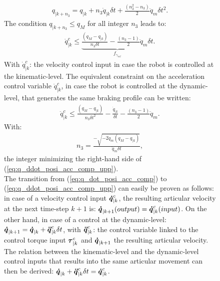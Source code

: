 \begin{figure}[!htbp]
\begin{equation}
\begin{split}
q_{|k+n_3} = q_{|k} + n_3 \dot{q}_{|k} \delta t + \frac{(n_3^2-n_3)}{2} \ddot{q}_{m} \delta t^2.
\label{eq:q_evolution_with_const_qddot_m}
\end{split}
\end{equation}
The condition $q_{|k+n_3} \leq q_{M}$ for all integer $n_3$ leads to:
\begin{equation}
\begin{split}
\dot{q}_{|k}^{c} \leq \underbrace{\frac{(q_M-q_{|k})}{n_3 \delta t} - \frac{(n_3-1)}{2} \ddot{q}_m \delta t}_{f_{{\gamma}_{vel}}}. 
\label{eq:q_dot_posi_acc_comp}
\end{split}
\end{equation}
With $\dot{q}_{|k}^{c}$: the velocity control input in case the robot is controlled at the kinematic-level. The equivalent constraint on the acceleration control variable $\ddot{q}_{|k}^{c}$, in case the robot is controlled at the dynamic-level, that generates the same braking profile can be written:
\begin{equation}
\begin{split}
\ddot{q}_{|k}^{c} \leq \frac{(q_M-q_{|k})}{n_3 \delta t^2} - \frac{\dot{q}_{|k}}{\delta t} - \frac{(n_3-1)}{2} \ddot{q}_m.
\label{eq:q_ddot_posi_acc_comp_upp}
\end{split}
\end{equation}
With: 
\begin{equation}
\begin{split}
n_3 = \frac{-\sqrt{-2 \ddot{q}_m (q_M - q_{|k})}}{\ddot{q}_m \delta t},
\label{eq:n_3_Acc_posi_comp}
\end{split}
\end{equation}
the integer minimizing the right-hand side of (\ref{eq:q_ddot_posi_acc_comp_upp}). \\
The transition from (\ref{eq:q_dot_posi_acc_comp}) to (\ref{eq:q_ddot_posi_acc_comp_upp}) can easily be proven as follows: in case of a velocity control input $\mbox{\boldmath${\dot{q}}$}_{|k}^{c}$, the resulting articular velocity at the next time-step $k+1$ is: $\mbox{\boldmath${\dot{q}}$}_{|k+1} (output)= \mbox{\boldmath${\dot{q}}$}_{|k}^{c} (input)$. On the other hand, in case of a control at the dynamic-level: $\mbox{\boldmath${\dot{q}}$}_{|k+1} = \mbox{\boldmath${\dot{q}}$}_{|k}+\mbox{\boldmath${\ddot{q}}$}_{|k}^{c}\delta t$, with  $\mbox{\boldmath${\ddot{q}}$}_{|k}^{c}$: the control variable linked to the control torque input $\mbox{\boldmath${\tau}$}_{|k}^{c}$ and $\mbox{\boldmath${\dot{q}}$}_{|k+1}$ the resulting  articular velocity. The relation between the kinematic-level and the dynamic-level control inputs that results into the same articular movement can then be derived: $\mbox{\boldmath${\dot{q}}$}_{|k}+\mbox{\boldmath${\ddot{q}}$}_{|k}^{c}\delta t = \mbox{\boldmath${\dot{q}}$}_{|k}^{c}$.\\


\end{figure}
